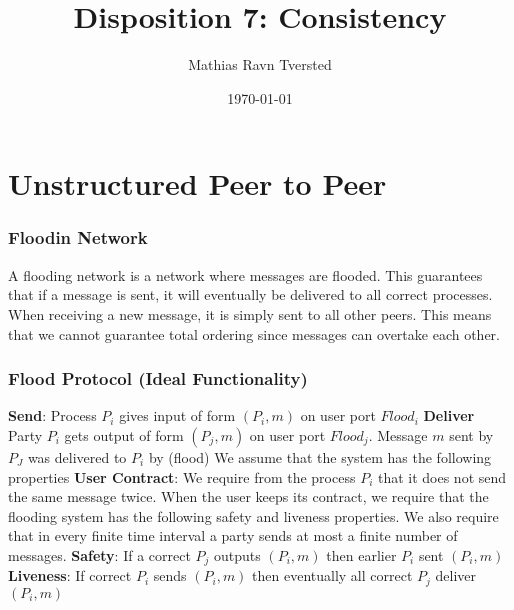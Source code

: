 
\newcommand{\N}{\mathbb{N}}

\title{Disposition 7: Consistency}   
\author{Mathias Ravn Tversted} 
\date{\today} 




\frame{\titlepage} 








\section{Unstructured Peer to Peer}
    \begin{frame}
        \frametitle{Floodin Network}
            A flooding network is a network where messages are flooded. This guarantees that if a message is sent, it will eventually be delivered to all correct processes. When receiving a new message, it is simply sent to all other peers. This means that we cannot guarantee total ordering since messages can overtake each other. 
    \end{frame}
    \begin{frame}
        \frametitle{Flood Protocol (Ideal Functionality)}
            \textbf{Send}: Process $P_i$ gives input of form $(P_i, m)$ on user port $Flood_i$
            \textbf{Deliver} Party $P_i$ gets output of form $(P_j, m)$ on user port $Flood_j$. Message $m$ sent by $P_J$ was delivered to $P_i$ by (flood)
            We assume that the system has the following properties
            \textbf{User Contract}: We require from the process $P_i$ that it does not send the same message twice. When the user keeps its contract, we require that the flooding system has the following safety and liveness properties. We also require that in every finite time interval a party sends at most a finite number of messages.
            \textbf{Safety}: If a correct $P_j$ outputs $(P_i, m)$ then earlier $P_i$ sent $(P_i, m)$
            \textbf{Liveness}: If correct $P_i$ sends $(P_i, m)$ then eventually all correct $P_j$ deliver $(P_i, m)$
    \end{frame}

